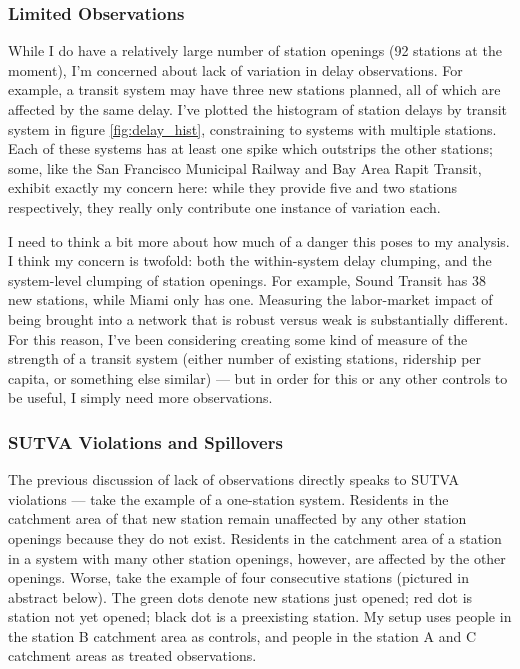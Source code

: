 \documentclass[12pt]{article}
\begin{document}
\subsubsection{Limited Observations}\label{subsubsec:lim_obs}
While I do have a relatively large number of station openings (92 stations at the moment), I'm concerned about lack of variation in delay observations. For example, a transit system may have three new stations planned, all of which are affected by the same delay. I've plotted the histogram of station delays by transit system in figure \ref{fig:delay_hist}, constraining to systems with multiple stations. Each of these systems has at least one spike which outstrips the other stations; some, like the San Francisco Municipal Railway and Bay Area Rapit Transit, exhibit exactly my concern here: while they provide five and two stations respectively, they really only contribute one instance of variation each. 

I need to think a bit more about how much of a danger this poses to my analysis. I think my concern is twofold: both the within-system delay clumping, and the system-level clumping of station openings. For example, Sound Transit has 38 new stations, while Miami only has one. Measuring the labor-market impact of being brought into a network that is robust versus weak is substantially different. For this reason, I've been considering creating some kind of measure of the strength of a transit system (either number of existing stations, ridership per capita, or something else similar) --- but in order for this or any other controls to be useful, I simply need more observations. 

\subsubsection{SUTVA Violations and Spillovers}
The previous discussion of lack of observations directly speaks to SUTVA violations --- take the example of a one-station system. Residents in the catchment area of that new station remain unaffected by any other station openings because they do not exist. Residents in the catchment area of a station in a system with many other station openings, however, are affected by the other openings. Worse, take the example of four consecutive stations (pictured in abstract below). The green dots denote new stations just opened; red dot is station not yet opened; black dot is a preexisting station. My setup uses people in the station B catchment area as controls, and people in the station A and C catchment areas as treated observations. 
\end{document}
